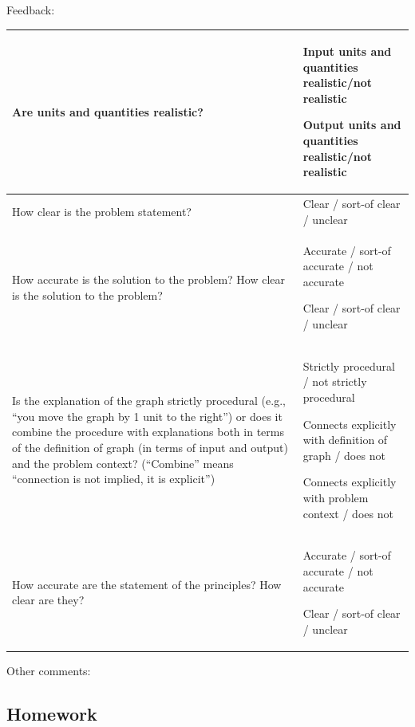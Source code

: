 \documentclass[11pt]{article}
\theoremstyle{definition}
\begin{document}
Feedback:
\begin{tabular}{L{2.3in}|L{4.5in}}
\hline 
Are units and quantities realistic? \vspace*{0.5in}
	& 
	Input units and quantities realistic/not realistic
	
	Output units and quantities realistic/not realistic
\\ 
\hline
How clear is the problem statement?\vspace*{0.5in}
	& 
	Clear / sort-of clear / unclear 
\\ 
\hline
How accurate is the solution to the problem? How clear is the solution to the problem? \vspace*{0.5in}
	& 
	Accurate / sort-of accurate / not accurate  
	
	Clear / sort-of clear / unclear 
\\ 
\hline
Is the explanation of the graph strictly procedural (e.g., ``you move the graph by 1 unit to the right'') or does it combine the procedure with explanations both in terms of the definition of graph (in terms of input and output) and the problem context? (``Combine'' means ``connection is not implied, it is explicit'') \vspace*{1in}
	&
	Strictly procedural / not strictly procedural
	
	Connects explicitly with definition of graph /  does not 
	
	Connects explicitly with problem context / does not \\
\hline
How accurate are the statement of the principles? How clear are they?  \vspace*{1in}
	& Accurate / sort-of accurate / not accurate  
	
	Clear / sort-of clear / unclear  \\ 
\hline
\end{tabular}

Other comments:


\newpage \subsection{Homework}

\end{document}
